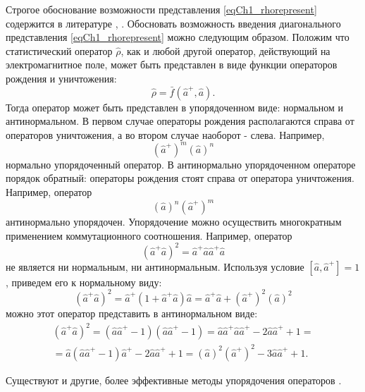 Строгое обоснование возможности представления \eqref{eqCh1_rhorepresent}
содержится в литературе \cite{bQuantumOpticsAndRadioPhisicsLecture1966},
\cite{bKaluderSudershan1970}. 
Обосновать возможность введения диагонального представления
\eqref{eqCh1_rhorepresent} можно следующим образом. Положим что
статистический оператор $\hat{\rho}$, как и любой другой оператор,
действующий на электромагнитное поле, может быть представлен в виде
функции операторов рождения и уничтожения:
\[
\hat{\rho} = \bar{f}\left(\hat{a}^{+}, \hat{a}\right).
\]
Тогда оператор может быть представлен в упорядоченном виде: нормальном
и антинормальном. В первом случае операторы рождения располагаются
справа от операторов уничтожения, а во втором случае наоборот - слева.
Например, 
\[
\left(\hat{a}^{+}\right)^m\left(\hat{a}\right)^n
\]
нормально упорядоченный оператор. В антинормально упорядоченном
операторе порядок обратный: операторы рождения стоят справа от
оператора уничтожения. Например, оператор 
\[
\left(\hat{a}\right)^n\left(\hat{a}^{+}\right)^m
\]
антинормально упорядочен. Упорядочение можно осуществить многократным
применением коммутационного соотношения. Например, оператор  
\[
\left(\hat{a}^{+}\hat{a}\right)^2 =
\hat{a}^{+}\hat{a}\hat{a}^{+}\hat{a} 
\]
не является ни нормальным, ни антинормальным. Используя условие 
$\left[\hat{a},\hat{a}^{+}\right] = 1$,
приведем его к нормальному виду: 
\[
\left(\hat{a}^{+}\hat{a}\right)^2 = \hat{a}^{+}\left(1 +
\hat{a}^{+}\hat{a}\right)\hat{a} = 
\hat{a}^{+}\hat{a} + \left(\hat{a}^{+}\right)^2\left(\hat{a}\right)^2
\]
можно этот оператор представить в антинормальном виде:
\begin{eqnarray}
\left(\hat{a}^{+}\hat{a}\right)^2 = 
\left(\hat{a}\hat{a}^{+} - 1\right) \left(\hat{a}\hat{a}^{+} -
1\right) = \hat{a}\hat{a}^{+} \hat{a}\hat{a}^{+} - 2
\hat{a}\hat{a}^{+} + 1 =
\nonumber \\
= \hat{a}\left(\hat{a}\hat{a}^{+} - 1\right)\hat{a}^{+} -
2\hat{a}\hat{a}^{+} + 1 = 
\left(\hat{a}\right)^2\left(\hat{a}^{+}\right)^2 - 3
\hat{a}\hat{a}^{+} + 1.
\nonumber
\end{eqnarray}

Существуют и другие, более эффективные методы упорядочения операторов
\cite{bLuisell1972}.


